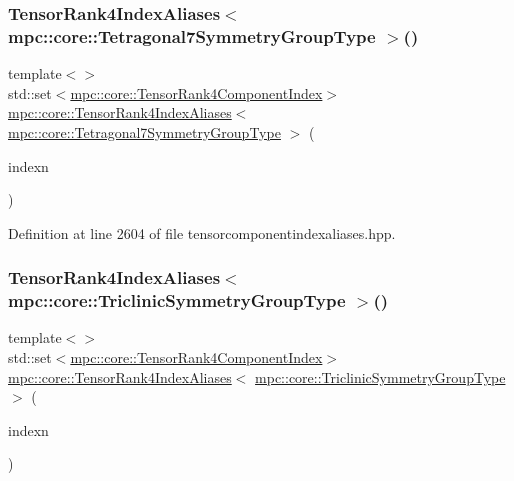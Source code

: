 \subsubsection{\texorpdfstring{Tensor\+Rank4\+Index\+Aliases$<$ mpc\+::core\+::\+Tetragonal7\+Symmetry\+Group\+Type $>$()}{TensorRank4IndexAliases< mpc::core::Tetragonal7SymmetryGroupType >()}}
{\footnotesize\ttfamily template$<$$>$ \\
std\+::set$<$\mbox{\hyperlink{namespacempc_1_1core_a54c081f41b2475abd10182bf023805d2}{mpc\+::core\+::\+Tensor\+Rank4\+Component\+Index}}$>$ \mbox{\hyperlink{namespacempc_1_1core_a40d1fb8009b3f7c34a6ea01a4b46027f}{mpc\+::core\+::\+Tensor\+Rank4\+Index\+Aliases}}$<$ \mbox{\hyperlink{structmpc_1_1core_1_1_tetragonal7_symmetry_group_type}{mpc\+::core\+::\+Tetragonal7\+Symmetry\+Group\+Type}} $>$ (\begin{DoxyParamCaption}\item[{const \mbox{\hyperlink{classmpc_1_1core_1_1_tensor_rank_n_component_index}{mpc\+::core\+::\+Tensor\+Rank\+N\+Component\+Index}}$<$ 4 $>$ \&}]{indexn }\end{DoxyParamCaption})\hspace{0.3cm}{\ttfamily [inline]}}



Definition at line 2604 of file tensorcomponentindexaliases.\+hpp.

\mbox{\label{namespacempc_1_1core_a4ff433f9ec4bb5fc7b191316479e269d}} 
\subsubsection{\texorpdfstring{Tensor\+Rank4\+Index\+Aliases$<$ mpc\+::core\+::\+Triclinic\+Symmetry\+Group\+Type $>$()}{TensorRank4IndexAliases< mpc::core::TriclinicSymmetryGroupType >()}}
{\footnotesize\ttfamily template$<$$>$ \\
std\+::set$<$\mbox{\hyperlink{namespacempc_1_1core_a54c081f41b2475abd10182bf023805d2}{mpc\+::core\+::\+Tensor\+Rank4\+Component\+Index}}$>$ \mbox{\hyperlink{namespacempc_1_1core_a40d1fb8009b3f7c34a6ea01a4b46027f}{mpc\+::core\+::\+Tensor\+Rank4\+Index\+Aliases}}$<$ \mbox{\hyperlink{structmpc_1_1core_1_1_triclinic_symmetry_group_type}{mpc\+::core\+::\+Triclinic\+Symmetry\+Group\+Type}} $>$ (\begin{DoxyParamCaption}\item[{const \mbox{\hyperlink{classmpc_1_1core_1_1_tensor_rank_n_component_index}{mpc\+::core\+::\+Tensor\+Rank\+N\+Component\+Index}}$<$ 4 $>$ \&}]{indexn }\end{DoxyParamCaption})\hspace{0.3cm}{\ttfamily [inline]}}




